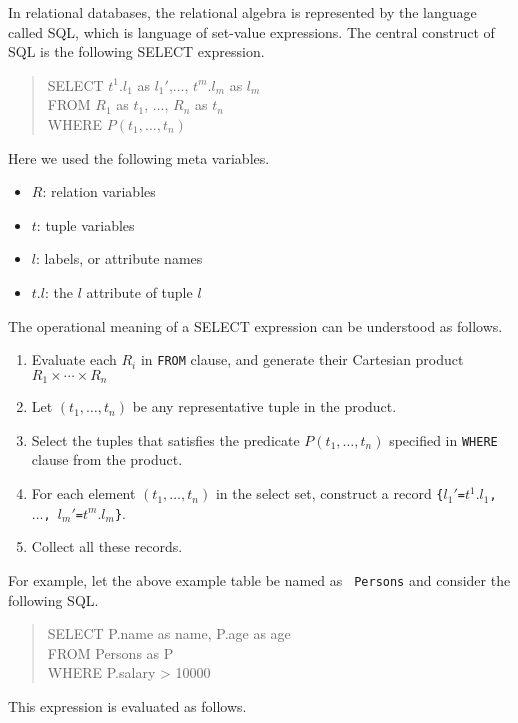 \documentclass{jbook}
\newenvironment{program}{\begin{quote}\begin{tt}}%
                        {\end{tt}\end{quote}}
\begin{document}
	In relational databases, the relational algebra is represented
by the language called SQL, which is language of set-value expressions.
	The central construct of SQL is the following SELECT expression.
\begin{program}
SELECT $t^1.l_1$ as $l_1'$,$\ldots$, $t^m.l_m$ as $l_m$\\
FROM $R_1$ as $t_1$, $\ldots$, $R_n$ as $t_n$\\
WHERE $P(t_1,\ldots, t_n)$
\end{program}
	Here we used the following meta variables.
\begin{itemize}
\item $R$: relation variables
\item $t$: tuple variables
\item $l$: labels, or attribute names
\item $t.l$: the $l$ attribute of tuple $l$
\end{itemize}
	The operational meaning of a SELECT expression can be understood
as follows.
\begin{enumerate}
\item Evaluate each $R_i$ in {\tt FROM} clause, and generate their Cartesian product
$
R_1 \times \cdots \times R_n
$
\item Let $(t_1,\ldots,t_n)$ be any representative tuple in the product.
\item Select the tuples that satisfies the predicate $P(t_1,\ldots,t_n)$
specified in {\tt WHERE} clause from the product.
\item
	For each element $(t_1,\ldots,t_n)$ in the select set, construct
a record  {\tt \{$l_1'$=$t^1.l_1$, $\ldots$, $l_m'$=$t^m.l_m$\}}.

\item Collect all these records.
\end{enumerate}
	For example, let the above example table be named as {\tt
Persons} and consider the following SQL.
\begin{program}
SELECT P.name as name, P.age as age\\
FROM Persons as P\\
WHERE P.salary > 10000
\end{program}
	This expression is evaluated as follows.
\end{document}
